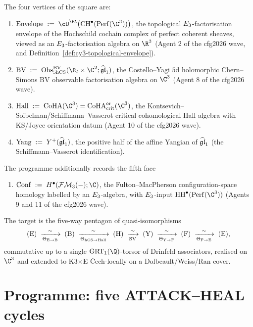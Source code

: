 The four vertices of the square are:
\begin{enumerate}
\item[(E)] $\mathrm{Envelope} \;:=\; \cU^\FA\bigl(\CH^\bullet(\Perf(\C^3))\bigr)$,
the topological $E_3$-factorisation envelope of the Hochschild
cochain complex of perfect coherent sheaves, viewed as an
$E_3$-factorisation algebra on $\R^3$ (Agent 2 of the cfg2026 wave,
and Definition~\ref{def:cy3-topological-envelope}).
\item[(B)] $\mathrm{BV} \;:=\; \Obs^{\BV}_{5\hCS}(\R_t\times\C^2;\ghat)$,
the Costello--Yagi $5$d holomorphic Chern--Simons BV observable
factorisation algebra on $\C^3$ (Agent 8 of the cfg2026 wave).
\item[(H)] $\mathrm{Hall} \;:=\; \CoHA(\C^3) = \CoHA_{\mathrm{crit}}^{\mathrm{or}}(\C^3)$,
the Kontsevich--Soibelman/Schiffmann--Vasserot critical cohomological
Hall algebra with KS/Joyce orientation datum (Agent 10 of the cfg2026
wave).
\item[(Y)] $\mathrm{Yang} \;:=\; Y^+(\widehat{\mathfrak{gl}}_1)$, the positive half of the
affine Yangian of $\widehat{\mathfrak{gl}}_1$ (the Schiffmann--Vasserot identification).
\end{enumerate}
The programme additionally records the fifth face
\begin{enumerate}
\item[(F)] $\mathrm{Conf} \;:=\; H^\bullet(\FM_3(-);\C)$, the
Fulton--MacPherson configuration-space homology labelled by an
$E_3$-algebra, with $E_3$-input $\HH^\bullet(\Perf(\C^3))$
(Agents 9 and 11 of the cfg2026 wave).
\end{enumerate}
The target is the five-way pentagon of quasi-isomorphisms
\[
(\mathrm{E})
\;\xrightarrow[\Theta_{\mathrm E\to\mathrm B}]{\sim}\;
(\mathrm{B})
\;\xrightarrow[\Theta_{\mathrm{hCS}\to\mathrm{Hall}}]{\sim}\;
(\mathrm{H})
\;\xrightarrow[\mathrm{SV}]{\sim}\;
(\mathrm{Y})
\;\xrightarrow[\Theta_{\mathrm Y\to\mathrm F}]{\sim}\;
(\mathrm{F})
\;\xrightarrow[\Theta_{\mathrm F\to\mathrm E}]{\sim}\;
(\mathrm{E}),
\]
commutative up to a single $\GRT_1(\Q)$-torsor of Drinfeld associators,
realised on $\C^3$ and extended to K3$\times$E \v{C}ech-locally on a
Dolbeault/Weiss/Ran cover.

\section*{Programme: five ATTACK--HEAL cycles}

